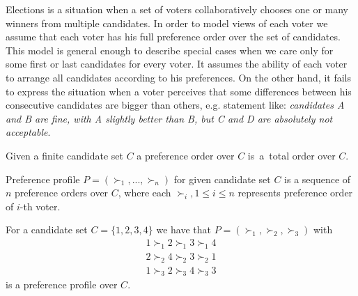 Elections is a situation when a set of voters collaboratively chooses one or many winners from multiple candidates.
In order to model views of each voter we assume that each voter has his full preference order over the set of candidates.
This model is general enough to describe special cases when we care only for some first or last candidates for every voter.
It assumes the ability of each voter to arrange all candidates according to his preferences.
On the other hand, it fails to express the situation when a voter perceives that some differences
between his consecutive candidates are bigger than others, e.g. statement like:
\textit{candidates A and B are fine, with A slightly better than B, but C and D are absolutely not acceptable}.

\begin{defn}
Given a finite candidate set $C$ a preference order over $C$
is~a~total order over $C$.
\end{defn}

\begin{defn}
Preference profile $P = (\succ_1, ... , \succ_n)$ for given candidate set $C$
is a sequence of $n$ preference orders over $C$,
where each $\succ_i, 1 \leq i \leq n$ represents preference order of $i$-th voter.
\end{defn}


\begin{exmp}
For a candidate set $C = \{1, 2, 3, 4\}$ we have that $P = (\succ_1, \succ_2, \succ_3)$ with
\begin{align*}
1 \succ_1 2 \succ_1 3 \succ_1 4 \\
2 \succ_2 4 \succ_2 3 \succ_2 1	\\
1 \succ_3 2 \succ_3 4 \succ_3 3
\end{align*}
is a preference profile over $C$.
\end{exmp}